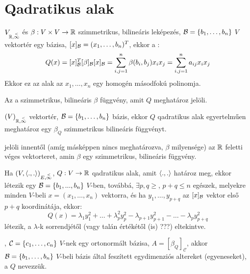 \section{Qadratikus alak}
\begin{ff}
	$V_{\mathbb{R},\overset{<}{\infty}}$ és $\beta:V\times V\to \mathbb{R}$ szimmetrikus, bilineáris leképezés,
	$\mathcal{B}=\{b_1,\ldots,b_n\}$ $V$ vektortér egy bázisa,
	$[x]_{\mathcal{B}}=(x_1,\ldots,b_n)^T$, ekkor a :
	\begin{equation*}
		Q(x)=[x]_{\mathcal{B}}^T[\beta]_{\mathcal{B}}[x]_{\mathcal{B}}=\sum_{i,j=1}^n\beta(b_i,b_j)x_ix_j=\sum_{i,j=1}^n
		a_{ij}x_ix_j
	\end{equation*}
	Ekkor ez az alak az $x_1,\ldots,x_n$ egy homogén másodfokú polinomja.
\end{ff}

\begin{jel}
	Az a szimmetrikus, bilineáris $\beta$ függvény, amit $Q$ meghatároz
	 jelöli.
\end{jel}

\begin{all}
	$(V)_{\mathbb{R},\overset{<}{\infty}}$ vektortér, $\mathcal{B}=\{b_1,\ldots,b_n\}$ bázis, ekkor $Q$
	qadratikus alak egyertelműen meghatároz egy $\beta_Q$ szimmetrikus
	bilineáris függvényt.
\end{all}

\begin{jel}
	 jelöli innentől (amíg másképpen nincs
	meghatározva, $\beta$ milyensége) az $\mathbb{R}$ feletti véges vektorteret,
	amin $\beta$ egy szimmetrikus, bilineáris függvény.
\end{jel}

\begin{tet}
	Ha $(V,\langle.,.\rangle)_{E,\overset{<}{\infty}}$, $Q:V\to \mathbb{R}$ qadratikus alak, amit $\langle.,.\rangle$ határoz meg,
	ekkor létezik egy $\mathcal{B}=\{b_1,...,b_n\}$ $V$-ben, továbbá, $\exists p,q\ge$,
	$p+q\le n$ egészek, melyekre minden $V$-beli $x=(x_1,\ldots,x_n)$
	vektorra, és ha $y_1,\ldots,y_{p+q}$ az $[x]_{\mathcal{B}}$ vektor első $p+q$
	koordinátája, ekkor:
	\begin{equation*}
		Q(x)=\lambda_1y_1^2+\ldots+\lambda_p^2y_p^2-\lambda_{p+1}y_{p+1}^2-\ldots-
		\lambda_py_{p+q}^2
	\end{equation*}
	létezik, a $\lambda$-k sorrendjétől (vagy talán értékétől (is) ???) eltekintve.
\end{tet}

\begin{ff}
	, $\mathcal{C}=\{c_1,\dots,c_n\}$ $V$-nek egy ortonormált
	bázisa, $A=[\beta_Q]_\mathcal{C}$, akkor $\mathcal{B}=\{b_1,\ldots,b_n\}$
	$V$-beli bázis által feszített egydimenziós altereket (egyeneseket), a
	$Q$  nevezzük.
\end{ff}

